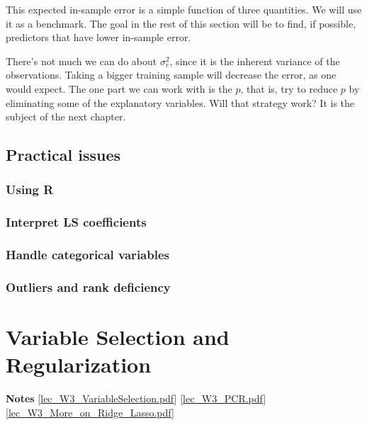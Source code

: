 \documentclass[
]{book}
\begin{document}
This expected in-sample error is a simple function of three quantities. We will use it as a benchmark. The goal in the rest
of this section will be to find, if possible, predictors that have lower in-sample error.

There's not much we can do about \(\sigma^2_e\),
since it is the inherent variance of the observations. Taking a bigger training sample will decrease the error,
as one would expect. The one part we can work with is the \(p\), that is, try to reduce \(p\) by eliminating some of the
explanatory variables. Will that strategy work? It is the subject of the next chapter.

\hypertarget{practical-issues}{%
\section{Practical issues}\label{practical-issues}}

\hypertarget{using-r}{%
\subsection{Using R}\label{using-r}}

\hypertarget{interpret-ls-coefficients}{%
\subsection{Interpret LS coefficients}\label{interpret-ls-coefficients}}

\hypertarget{handle-categorical-variables}{%
\subsection{Handle categorical variables}\label{handle-categorical-variables}}

\hypertarget{outliers-and-rank-deficiency}{%
\subsection{Outliers and rank deficiency}\label{outliers-and-rank-deficiency}}

\hypertarget{variable-selection-and-regularization}{%
\chapter{Variable Selection and Regularization}\label{variable-selection-and-regularization}}

\textbf{Notes}
{[}\href{https://liangfgithub.github.io/Notes/lec_W3_VariableSelection.pdf}{lec\_W3\_VariableSelection.pdf}{]}
{[}\href{https://liangfgithub.github.io/Notes/lec_W3_PCR.pdf}{lec\_W3\_PCR.pdf}{]}
{[}\href{https://liangfgithub.github.io/Notes/lec_W3_More_on_Ridge_Lasso.pdf}{lec\_W3\_More\_on\_Ridge\_Lasso.pdf}{]}
\end{document}
